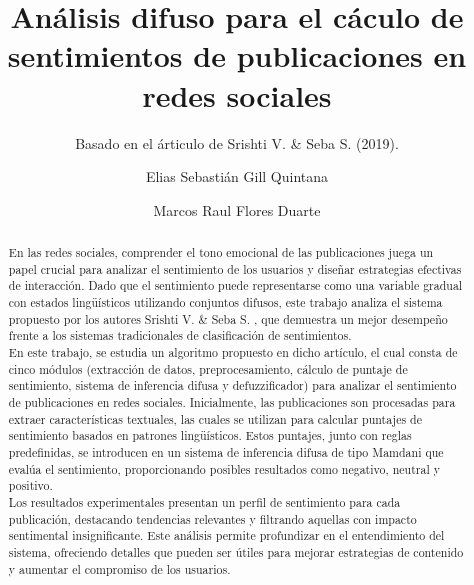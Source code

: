 \documentclass[sigconf, review=false, nonacm]{acmart}
\begin{document}
\title{Análisis difuso para el cáculo de sentimientos de publicaciones en redes sociales} \subtitle{Basado en
	el árticulo de Srishti V. \& Seba S. (2019).}

\author{Elias Sebastián Gill Quintana}

\author{Marcos Raul Flores Duarte}


\begin{abstract}
	En las redes sociales, comprender el tono emocional de las publicaciones juega un papel crucial para
	analizar el sentimiento de los usuarios y diseñar estrategias efectivas de interacción. Dado que el
	sentimiento puede representarse como una variable gradual con estados lingüísticos utilizando conjuntos
	difusos, este trabajo analiza el sistema propuesto por los autores Srishti V. \& Seba S. \cite{paper}, que
	demuestra un mejor desempeño frente a los sistemas tradicionales de clasificación de sentimientos.\\

	En este trabajo, se estudia un algoritmo propuesto en dicho artículo, el cual consta de cinco módulos
	(extracción de datos, preprocesamiento, cálculo de puntaje de sentimiento, sistema de inferencia difusa y
	defuzzificador) para analizar el sentimiento de publicaciones en redes sociales. Inicialmente, las
	publicaciones son procesadas para extraer características textuales, las cuales se utilizan para calcular
	puntajes de sentimiento basados en patrones lingüísticos. Estos puntajes, junto con reglas predefinidas,
	se introducen en un sistema de inferencia difusa de tipo Mamdani que evalúa el sentimiento, proporcionando
	posibles resultados como negativo, neutral y positivo.\\

	Los resultados experimentales presentan un perfil de sentimiento para cada publicación, destacando
	tendencias relevantes y filtrando aquellas con impacto sentimental insignificante. Este análisis permite
	profundizar en el entendimiento del sistema, ofreciendo detalles que pueden ser útiles para mejorar
	estrategias de contenido y aumentar el compromiso de los usuarios.
\end{abstract}
\end{document}
